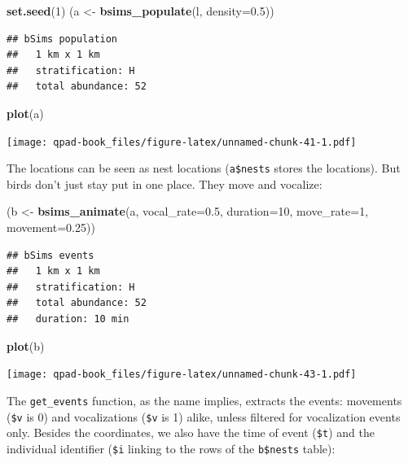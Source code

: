 \documentclass[12pt,]{book}
\newenvironment{Shaded}{\begin{snugshade}}{\end{snugshade}}
\newcommand{\DataTypeTok}[1]{\textcolor[rgb]{0.13,0.29,0.53}{#1}}
\newcommand{\DecValTok}[1]{\textcolor[rgb]{0.00,0.00,0.81}{#1}}
\newcommand{\FloatTok}[1]{\textcolor[rgb]{0.00,0.00,0.81}{#1}}
\newcommand{\KeywordTok}[1]{\textcolor[rgb]{0.13,0.29,0.53}{\textbf{#1}}}
\newcommand{\NormalTok}[1]{#1}
\newcommand{\StringTok}[1]{\textcolor[rgb]{0.31,0.60,0.02}{#1}}
\begin{document}
\begin{Shaded}
\begin{Highlighting}[]
\KeywordTok{set.seed}\NormalTok{(}\DecValTok{1}\NormalTok{)}
\NormalTok{(a <-}\StringTok{ }\KeywordTok{bsims_populate}\NormalTok{(l, }\DataTypeTok{density=}\FloatTok{0.5}\NormalTok{))}
\end{Highlighting}
\end{Shaded}

\begin{verbatim}
## bSims population
##   1 km x 1 km
##   stratification: H
##   total abundance: 52
\end{verbatim}

\begin{Shaded}
\begin{Highlighting}[]
\KeywordTok{plot}\NormalTok{(a)}
\end{Highlighting}
\end{Shaded}

\texttt{[image: qpad-book\_files/figure-latex/unnamed-chunk-41-1.pdf]}

The locations can be seen as nest locations (\texttt{a\$nests} stores the locations).
But birds don't just stay put in one place. They move and vocalize:

\begin{Shaded}
\begin{Highlighting}[]
\NormalTok{(b <-}\StringTok{ }\KeywordTok{bsims_animate}\NormalTok{(a, }
  \DataTypeTok{vocal_rate=}\FloatTok{0.5}\NormalTok{, }\DataTypeTok{duration=}\DecValTok{10}\NormalTok{,}
  \DataTypeTok{move_rate=}\DecValTok{1}\NormalTok{, }\DataTypeTok{movement=}\FloatTok{0.25}\NormalTok{))}
\end{Highlighting}
\end{Shaded}

\begin{verbatim}
## bSims events
##   1 km x 1 km
##   stratification: H
##   total abundance: 52
##   duration: 10 min
\end{verbatim}

\begin{Shaded}
\begin{Highlighting}[]
\KeywordTok{plot}\NormalTok{(b)}
\end{Highlighting}
\end{Shaded}

\texttt{[image: qpad-book\_files/figure-latex/unnamed-chunk-43-1.pdf]}

The \texttt{get\_events} function, as the name implies, extracts the events:
movements (\texttt{\$v} is 0) and vocalizations (\texttt{\$v} is 1) alike,
unless filtered for vocalization events only.
Besides the coordinates, we also have the time of event (\texttt{\$t}) and
the individual identifier (\texttt{\$i} linking to the rows of the \texttt{b\$nests} table):
\end{document}
